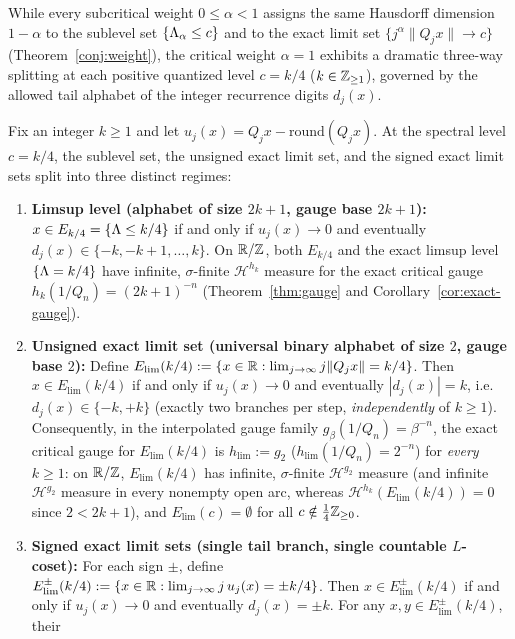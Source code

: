 While every subcritical weight $0\le\alpha<1$ assigns the same Hausdorff
dimension $1-\alpha$ to the sublevel set $\{\Lambda_\alpha\le c\}$ and to the
exact limit set $\{j^\alpha\|Q_jx\|\to c\}$ (Theorem~\ref{conj:weight}), the
critical weight $\alpha=1$ exhibits a dramatic three-way splitting at each
positive quantized level $c=k/4$ ($k\in\mathbb{Z}_{\ge1}$), governed by the allowed
tail alphabet of the integer recurrence digits $d_j(x)$.

\begin{theorem}\label{thm:trichotomy}
Fix an integer $k\ge1$ and let $u_j(x)=Q_jx-\mathrm{round}(Q_jx)$. At the
spectral level $c=k/4$, the sublevel set, the unsigned exact limit set, and
the signed exact limit sets split into three distinct regimes:
\begin{enumerate}[label=(\roman*),leftmargin=2em]
\item \textbf{Limsup level (alphabet of size $2k+1$, gauge base $2k+1$):}
$x\in E_{k/4}=\{\Lambda\le k/4\}$ if and only if $u_j(x)\to0$ and eventually
$d_j(x)\in\{-k,-k+1,\dots,k\}$. On $\mathbb{R}/\mathbb{Z}$, both $E_{k/4}$ and the exact
limsup level $\{\Lambda=k/4\}$ have infinite, $\sigma$-finite $\mathcal H^{h_k}$
measure for the exact critical gauge $h_k(1/Q_n)=(2k+1)^{-n}$
(Theorem~\ref{thm:gauge} and Corollary~\ref{cor:exact-gauge}).
\item \textbf{Unsigned exact limit set (universal binary alphabet of size $2$, gauge base $2$):}
Define $E_{\mathrm{lim}}(k/4):=\{x\in\mathbb{R}:\lim_{j\to\infty}j\|Q_jx\|=k/4\}$.
Then $x\in E_{\mathrm{lim}}(k/4)$ if and only if $u_j(x)\to0$ and eventually
$|d_j(x)|=k$, i.e.\ $d_j(x)\in\{-k,+k\}$ (exactly two branches per step,
\emph{independently} of $k\ge1$). Consequently, in the interpolated gauge
family $g_\beta(1/Q_n)=\beta^{-n}$, the exact critical gauge for
$E_{\mathrm{lim}}(k/4)$ is $h_{\mathrm{lim}}:=g_2$ ($h_{\mathrm{lim}}(1/Q_n)=2^{-n}$)
for \emph{every} $k\ge1$: on $\mathbb{R}/\mathbb{Z}$, $E_{\mathrm{lim}}(k/4)$ has infinite,
$\sigma$-finite $\mathcal H^{g_2}$ measure (and infinite $\mathcal H^{g_2}$
measure in every nonempty open arc, whereas
$\mathcal H^{h_k}(E_{\mathrm{lim}}(k/4))=0$ since $2<2k+1$), and
$E_{\mathrm{lim}}(c)=\emptyset$ for all $c\notin\frac14\mathbb{Z}_{\ge0}$.
\item \textbf{Signed exact limit sets (single tail branch, single countable $L$-coset):}
For each sign $\pm$, define
$E_{\mathrm{lim}}^\pm(k/4):=\{x\in\mathbb{R}:\lim_{j\to\infty}j\,u_j(x)=\pm k/4\}$.
Then $x\in E_{\mathrm{lim}}^\pm(k/4)$ if and only if $u_j(x)\to0$ and
eventually $d_j(x)=\pm k$. For any $x,y\in E_{\mathrm{lim}}^\pm(k/4)$, their

\end{enumerate}
\end{theorem}
